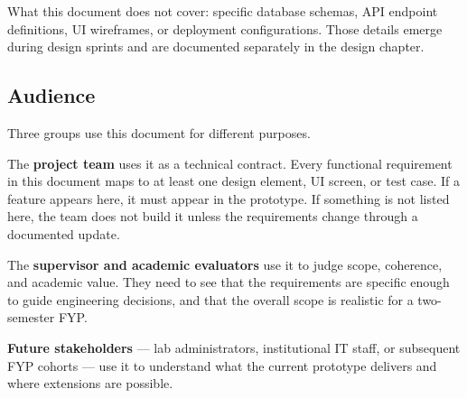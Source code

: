 What this document does not cover: specific database schemas, API endpoint definitions, UI wireframes, or deployment configurations. Those details emerge during design sprints and are documented separately in the design chapter.

\subsection{Audience}

Three groups use this document for different purposes.

The \textbf{project team} uses it as a technical contract. Every functional requirement in this document maps to at least one design element, UI screen, or test case. If a feature appears here, it must appear in the prototype. If something is not listed here, the team does not build it unless the requirements change through a documented update.

The \textbf{supervisor and academic evaluators} use it to judge scope, coherence, and academic value. They need to see that the requirements are specific enough to guide engineering decisions, and that the overall scope is realistic for a two-semester FYP.

\textbf{Future stakeholders} — lab administrators, institutional IT staff, or subsequent FYP cohorts — use it to understand what the current prototype delivers and where extensions are possible.
